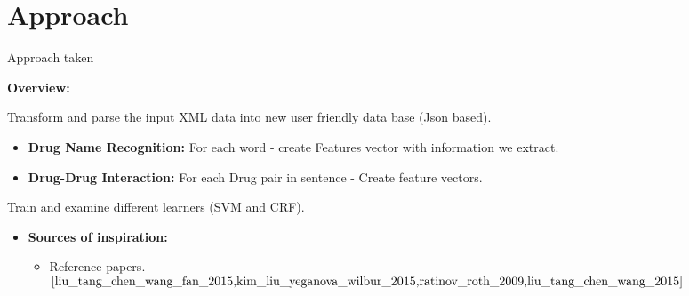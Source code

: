 \documentclass[xcolor=table]{beamer}
\begin{document}
    


    
    
      



\section{Approach} 
\begin{frame}{Approach taken}

    \textbf{Overview:}
    \begin{block}{}
    {
        Transform and parse the input XML data into new user friendly data base (Json based).
    }
    \end{block}
    \begin{block}{}
    \begin{itemize}
      \item {\textbf{Drug Name Recognition:}
        For each word - create Features vector with information we extract.
      }
      \item {\textbf{Drug-Drug Interaction:}
        For each Drug pair in sentence - Create feature vectors.
      }
    \end{itemize}
    \end{block}
    \begin{block}{}
        Train and examine different learners (SVM and CRF).
     \end{block}
    \begin{itemize}
    \item {
    \textbf{Sources of inspiration:}
    }
      \begin{itemize}
      \item {
        Reference papers.$^{\cite{liu_tang_chen_wang_fan_2015,kim_liu_yeganova_wilbur_2015,ratinov_roth_2009,liu_tang_chen_wang_2015}}$
      }
      \end{itemize}
    \end{itemize}

\end{frame}
 
\end{document}
